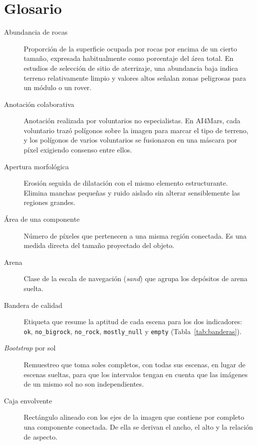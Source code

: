 \chapter*{Glosario}

{\sloppy
\begin{description}

  \item[Abundancia de rocas] Proporción de la superficie ocupada por rocas por
    encima de un cierto tamaño, expresada habitualmente como porcentaje del área
    total. En estudios de selección de sitio de aterrizaje, una abundancia baja
    indica terreno relativamente limpio y valores altos señalan zonas peligrosas
    para un módulo o un rover.

  \item[Anotación colaborativa] Anotación realizada por voluntarios no
    especialistas. En AI4Mars, cada voluntario trazó polígonos sobre la imagen para
    marcar el tipo de terreno, y los polígonos de varios voluntarios se fusionaron
    en una máscara por píxel exigiendo consenso entre ellos.

  \item[Apertura morfológica] Erosión seguida de dilatación con el mismo elemento
    estructurante. Elimina manchas pequeñas y ruido aislado sin alterar
    sensiblemente las regiones grandes.

  \item[Área de una componente] Número de píxeles que pertenecen a una misma
    región conectada. Es una medida directa del tamaño proyectado del objeto.

  \item[Arena] Clase de la escala de navegación (\textit{sand}) que agrupa los
    depósitos de arena suelta.

  \item[Bandera de calidad] Etiqueta que resume la aptitud de cada escena para los
    dos indicadores: \texttt{ok}, \texttt{no\_bigrock}, \texttt{no\_rock},
    \texttt{mostly\_null} y \texttt{empty} (Tabla~\ref{tab:banderas}).

  \item[\textit{Bootstrap} por sol] Remuestreo que toma soles completos, con todas
    sus escenas, en lugar de escenas sueltas, para que los intervalos tengan en
    cuenta que las imágenes de un mismo sol no son independientes.

  \item[Caja envolvente] Rectángulo alineado con los ejes de la imagen que contiene
    por completo una componente conectada. De ella se derivan el ancho, el alto y
    la relación de aspecto.


\end{description}}

